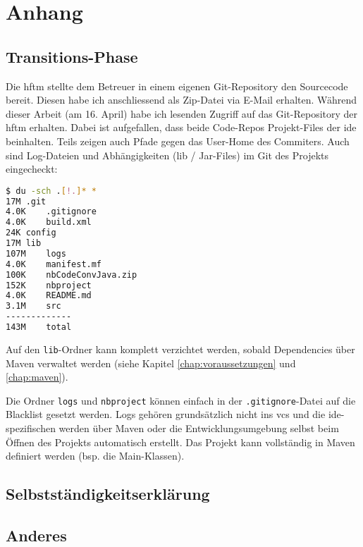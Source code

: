 \chapter{Anhang}
\section{Transitions-Phase}
Die \acrshort{hftm} stellte dem Betreuer in einem eigenen Git-Repository den Sourcecode bereit. Diesen habe ich anschliessend als Zip-Datei via E-Mail erhalten. Während dieser Arbeit (am 16. April) habe ich lesenden Zugriff auf das Git-Repository der \acrshort{hftm} erhalten\cite{gitlab.com/solidus/hefei}. Dabei ist aufgefallen, dass beide Code-Repos Projekt-Files der \acrshort{ide} beinhalten. Teils zeigen auch Pfade gegen das User-Home des Commiters. Auch sind Log-Dateien und Abhängigkeiten (lib / Jar-Files) im Git des Projekts eingecheckt:
\begin{lstlisting}[caption={Listing der Daten im Git-Repository 'gitlab.com/solidus/hefei'},language=Bash, columns=fixed]
$ du -sch .[!.]* *
17M	.git
4.0K	.gitignore
4.0K	build.xml
24K	config
17M	lib
107M	logs
4.0K	manifest.mf
100K	nbCodeConvJava.zip
152K	nbproject
4.0K	README.md
3.1M	src
-------------
143M	total
\end{lstlisting}

Auf den \verb|lib|-Ordner kann komplett verzichtet werden, sobald Dependencies über Maven verwaltet werden (siehe Kapitel \ref{chap:voraussetzungen} und \ref{chap:maven}).

Die Ordner \verb|logs| und \verb|nbproject| können einfach in der \verb|.gitignore|-Datei auf die Blacklist gesetzt werden. Logs gehören grundsätzlich nicht ins \acrshort{vcs} und die \acrshort{ide}-spezifischen werden über Maven oder die Entwicklungsumgebung selbst beim Öffnen des Projekts automatisch erstellt. Das Projekt kann vollständig in Maven definiert werden (bsp. die Main-Klassen).

\section{Selbstständigkeitserklärung}
\section{Anderes}

